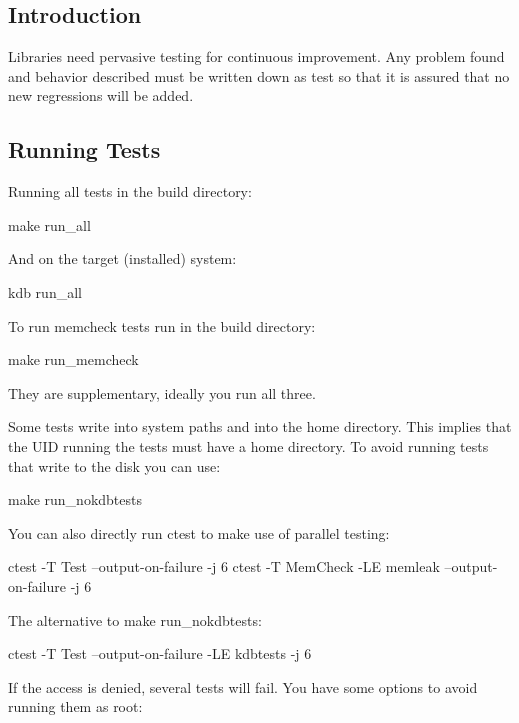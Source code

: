 \subsection*{Introduction}

Libraries need pervasive testing for continuous improvement. Any problem found and behavior described must be written down as test so that it is assured that no new regressions will be added.

\subsection*{Running Tests}

Running all tests in the build directory\+: \begin{DoxyVerb}make run_all
\end{DoxyVerb}


And on the target (installed) system\+: \begin{DoxyVerb}kdb run_all
\end{DoxyVerb}


To run {\ttfamily memcheck} tests run in the build directory\+: \begin{DoxyVerb}make run_memcheck
\end{DoxyVerb}


They are supplementary, ideally you run all three.

Some tests write into system paths and into the home directory. This implies that the U\+ID running the tests must have a home directory. To avoid running tests that write to the disk you can use\+: \begin{DoxyVerb}make run_nokdbtests
\end{DoxyVerb}


You can also directly run ctest to make use of parallel testing\+: \begin{DoxyVerb}ctest -T Test --output-on-failure -j 6
ctest -T MemCheck -LE memleak --output-on-failure -j 6
\end{DoxyVerb}


The alternative to {\ttfamily make run\+\_\+nokdbtests}\+: \begin{DoxyVerb}ctest -T Test --output-on-failure -LE kdbtests -j 6
\end{DoxyVerb}


If the access is denied, several tests will fail. You have some options to avoid running them as root\+:


